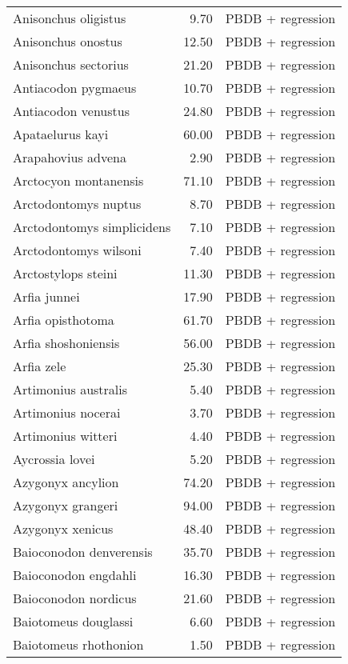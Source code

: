 \begin{table}[ht]
\begin{tabular}{lrl}
  Anisonchus oligistus & 9.70 & PBDB + regression \\ 
  Anisonchus onostus & 12.50 & PBDB + regression \\ 
  Anisonchus sectorius & 21.20 & PBDB + regression \\ 
  Antiacodon pygmaeus & 10.70 & PBDB + regression \\ 
  Antiacodon venustus & 24.80 & PBDB + regression \\ 
  Apataelurus kayi & 60.00 & PBDB + regression \\ 
  Arapahovius advena & 2.90 & PBDB + regression \\ 
  Arctocyon montanensis & 71.10 & PBDB + regression \\ 
  Arctodontomys nuptus & 8.70 & PBDB + regression \\ 
  Arctodontomys simplicidens & 7.10 & PBDB + regression \\ 
  Arctodontomys wilsoni & 7.40 & PBDB + regression \\ 
  Arctostylops steini & 11.30 & PBDB + regression \\ 
  Arfia junnei & 17.90 & PBDB + regression \\ 
  Arfia opisthotoma & 61.70 & PBDB + regression \\ 
  Arfia shoshoniensis & 56.00 & PBDB + regression \\ 
  Arfia zele & 25.30 & PBDB + regression \\ 
  Artimonius australis & 5.40 & PBDB + regression \\ 
  Artimonius nocerai & 3.70 & PBDB + regression \\ 
  Artimonius witteri & 4.40 & PBDB + regression \\ 
  Aycrossia lovei & 5.20 & PBDB + regression \\ 
  Azygonyx ancylion & 74.20 & PBDB + regression \\ 
  Azygonyx grangeri & 94.00 & PBDB + regression \\ 
  Azygonyx xenicus & 48.40 & PBDB + regression \\ 
  Baioconodon denverensis & 35.70 & PBDB + regression \\ 
  Baioconodon engdahli & 16.30 & PBDB + regression \\ 
  Baioconodon nordicus & 21.60 & PBDB + regression \\ 
  Baiotomeus douglassi & 6.60 & PBDB + regression \\ 
  Baiotomeus rhothonion & 1.50 & PBDB + regression \\ 

\end{tabular}
\end{table}
